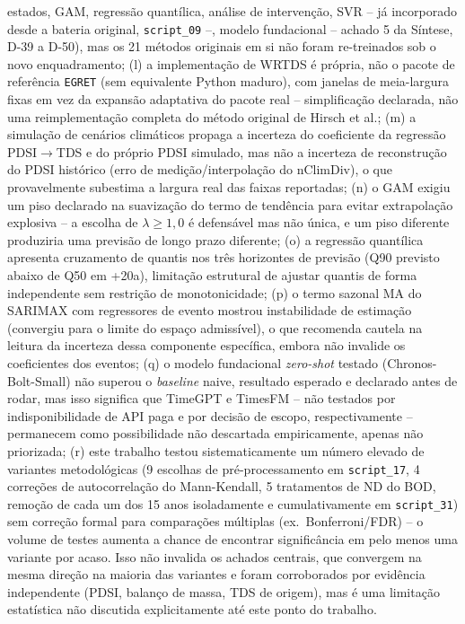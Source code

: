 estados, GAM, regressão quantílica, análise de intervenção, SVR -- já incorporado desde a bateria original, \texttt{script\_09} --, modelo fundacional -- achado 5 da Síntese, D-39 a D-50), mas os 21 métodos originais em si não foram re-treinados sob o novo enquadramento; (l) a implementação de WRTDS é própria, não o pacote de referência \texttt{EGRET} (sem equivalente Python maduro), com janelas de meia-largura fixas em vez da expansão adaptativa do pacote real -- simplificação declarada, não uma reimplementação completa do método original de Hirsch et al.; (m) a simulação de cenários climáticos propaga a incerteza do coeficiente da regressão PDSI$\to$TDS e do próprio PDSI simulado, mas não a incerteza de reconstrução do PDSI histórico (erro de medição/interpolação do nClimDiv), o que provavelmente subestima a largura real das faixas reportadas; (n) o GAM exigiu um piso declarado na suavização do termo de tendência para evitar extrapolação explosiva -- a escolha de $\lambda\geq1{,}0$ é defensável mas não única, e um piso diferente produziria uma previsão de longo prazo diferente; (o) a regressão quantílica apresenta cruzamento de quantis nos três horizontes de previsão (Q90 previsto abaixo de Q50 em +20a), limitação estrutural de ajustar quantis de forma independente sem restrição de monotonicidade; (p) o termo sazonal MA do SARIMAX com regressores de evento mostrou instabilidade de estimação (convergiu para o limite do espaço admissível), o que recomenda cautela na leitura da incerteza dessa componente específica, embora não invalide os coeficientes dos eventos; (q) o modelo fundacional \textit{zero-shot} testado (Chronos-Bolt-Small) não superou o \textit{baseline} naive, resultado esperado e declarado antes de rodar, mas isso significa que TimeGPT e TimesFM -- não testados por indisponibilidade de API paga e por decisão de escopo, respectivamente -- permanecem como possibilidade não descartada empiricamente, apenas não priorizada; (r) este trabalho testou sistematicamente um número elevado de variantes metodológicas (9 escolhas de pré-processamento em \texttt{script\_17}, 4 correções de autocorrelação do Mann-Kendall, 5 tratamentos de ND do BOD, remoção de cada um dos 15 anos isoladamente e cumulativamente em \texttt{script\_31}) sem correção formal para comparações múltiplas (ex.\ Bonferroni/FDR) -- o volume de testes aumenta a chance de encontrar significância em pelo menos uma variante por acaso. Isso não invalida os achados centrais, que convergem na mesma direção na maioria das variantes e foram corroborados por evidência independente (PDSI, balanço de massa, TDS de origem), mas é uma limitação estatística não discutida explicitamente até este ponto do trabalho.

